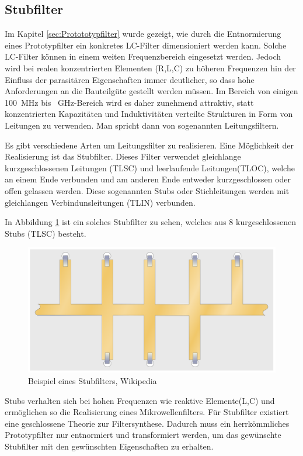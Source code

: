 \subsection{Stubfilter}

Im  Kapitel   \ref{sec:Protototypfilter}   wurde   gezeigt,   wie   durch  die
Entnormierung  eines  Prototypfilter  ein  konkretes  LC-Filter  dimensioniert
werden  kann.  Solche  LC-Filter  können   in   einem  weiten  Frequenzbereich
eingesetzt werden.  Jedoch wird bei realen konzentrierten Elementen (R,L,C) zu
höheren  Frequenzen hin  der  Einfluss  der  parasitären  Eigenschaften  immer
deutlicher, so dass  hohe  Anforderungen  an  die  Bauteilgüte gestellt werden
müssen.     Im    Bereich    von     einigen     \SI{100}{\mega\hertz}     bis
\SI{}{\giga\hertz}-Bereich   wird   es   daher   zunehmend  attraktiv,   statt
konzentrierten Kapazitäten und Induktivitäten verteilte Strukturen in Form von
Leitungen  zu  verwenden.\cite[p.~203]{ref:gustrau}   Man   spricht  dann  von
sogenannten Leitungsfiltern.

Es gibt  verschiedene Arten um Leitungsfilter zu realisieren. Eine Möglichkeit
der Realisierung  ist  das  Stubfilter.  Dieses  Filter  verwendet gleichlange
kurzgeschlossenen Leitungen (TLSC) und leerlaufende Leitungen(TLOC), welche an
einem   Ende   verbunden  und  am  anderen   Ende   entweder   kurzgeschlossen
oder offen gelassen werden. Diese sogenannten Stubs oder Stichleitungen werden
mit gleichlangen Verbindunsleitungen (TLIN) verbunden.

In  Abbildung \ref{fig:Stubfilter} ist ein solches Stubfilter zu sehen, welches aus
8 kurgeschlossenen Stubs (TLSC) besteht.

\begin{figure}[h!]
\centering
 	\includegraphics[width=\imagewidth]{images/Stripline_Stub_Filter}
 	\caption{Beispiel eines Stubfilters, Wikipedia \cite{ref:wikipedia:stripline}}
 	\label{fig:Stubfilter}
\end{figure}

Stubs  verhalten  sich bei hohen Frequenzen  wie  reaktive  Elemente(L,C)  und
ermöglichen  so  die  Realisierung  eines Mikrowellenfilters.  Für  Stubfilter
existiert  eine  geschlossene  Theorie  zur  Filtersynthese.  Dadurch muss ein
herrkömmliches Prototypfilter nur entnormiert und transformiert werden, um das
gewünschte   Stubfilter   mit   den  gewünschten  Eigenschaften  zu  erhalten.

